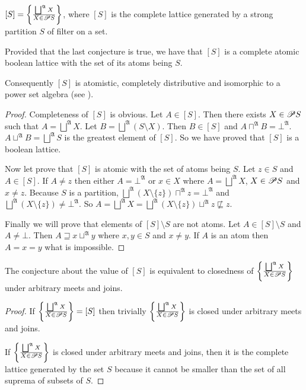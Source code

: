 \begin{conjecture}
$[S]=\left\{ \frac{\bigsqcup^{\mathfrak{A}}X}{X\in\mathscr{P} S}\right\}$, where
$[S]$ is the complete lattice generated by a strong partition $S$
of filter on a set.\end{conjecture}
\begin{prop}
Provided that the last conjecture is true, we have that $[S]$ is
a complete atomic boolean lattice with the set of its atoms being
$S$.\end{prop}
\begin{rem}
Consequently $[S]$ is atomistic, completely distributive and isomorphic
to a power set algebra (see \cite{wiki:bool-canon}).\end{rem}
\begin{proof}
Completeness of $[S]$ is obvious. Let $A\in[S]$. Then there exists
$X\in\mathscr{P} S$ such that $A=\bigsqcup^{\mathfrak{A}}X$. Let $B=\bigsqcup^{\mathfrak{A}}(S\setminus X)$.
Then $B\in[S]$ and $A\sqcap^{\mathfrak{A}}B=\bot^{\mathfrak{A}}$.
$A\sqcup^{\mathfrak{A}}B=\bigsqcup^{\mathfrak{A}}S$ is the greatest
element of $[S]$. So we have proved that $[S]$ is a boolean lattice.

Now let prove that $[S]$ is atomic with the set of atoms being $S$.
Let $z\in S$ and $A\in[S]$. If $A\ne z$ then either $A=\bot^{\mathfrak{A}}$
or $x\in X$ where $A=\bigsqcup^{\mathfrak{A}}X$, $X\in\mathscr{P} S$
and $x\ne z$. Because $S$ is a partition, $\bigsqcup^{\mathfrak{A}}(X\setminus\{z\})\sqcap^{\mathfrak{A}}z=\bot^{\mathfrak{A}}$
and $\bigsqcup^{\mathfrak{A}}(X\setminus\{z\})\ne\bot^{\mathfrak{A}}$.
So $A=\bigsqcup^{\mathfrak{A}}X=\bigsqcup^{\mathfrak{A}}(X\setminus\{z\})\sqcup^{\mathfrak{A}}z\nsqsubseteq z$.

Finally we will prove that elements of $[S]\setminus S$ are not atoms.
Let $A\in[S]\setminus S$ and $A\ne\bot$. Then $A\sqsupseteq x\sqcup^{\mathfrak{A}}y$
where $x,y\in S$ and $x\ne y$. If $A$ is an atom then $A=x=y$
what is impossible.\end{proof}
\begin{prop}
The conjecture about the value of $[S]$ is equivalent to closedness
of $\left\{ \frac{\bigsqcup^{\mathfrak{A}}X}{X\in\mathscr{P} S}\right\}$ under arbitrary
meets and joins.\end{prop}
\begin{proof}
If $\left\{ \frac{\bigsqcup^{\mathfrak{A}}X}{X\in\mathscr{P} S}\right\}=[S]$ then
trivially $\left\{ \frac{\bigsqcup^{\mathfrak{A}}X}{X\in\mathscr{P} S}\right\}$ is
closed under arbitrary meets and joins.

If $\left\{ \frac{\bigsqcup^{\mathfrak{A}}X}{X\in\mathscr{P} S}\right\}$ is closed
under arbitrary meets and joins, then it is the complete lattice generated
by the set $S$ because it cannot be smaller than the set of all suprema
of subsets of $S$.
\end{proof}
